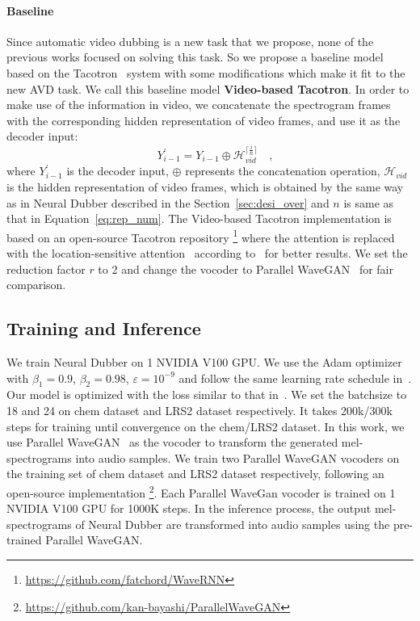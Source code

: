 \documentclass{article}
\begin{document}
\paragraph{Baseline}
\label{sec:taco}
Since automatic video dubbing is a new task that we propose, none of the previous works focused on solving this task. So we propose a baseline model based on the Tacotron~\cite{wang2017tacotron} system with some modifications which make it fit to the new AVD task. We call this baseline model \textbf{Video-based Tacotron}.
In order to make use of the information in video, we concatenate the spectrogram frames with the corresponding hidden representation of video frames, and use it as the decoder input:
\begin{equation}
\label{eq:taco}
\quad  Y^{'}_{i-1} = Y_{i-1} \oplus \mathcal{H}_{vid}^{\lceil \frac{i}{n} \rceil} \quad ,
\end{equation}
where $Y^{'}_{i-1}$ is the decoder input, $\oplus$ represents the concatenation operation, $\mathcal{H}_{vid}$ is the hidden representation of video frames, which is obtained by the same way as in Neural Dubber described in the Section~\ref{sec:desi_over} and $n$ is same as that in Equation~\eqref{eq:rep_num}.
The Video-based Tacotron implementation is based on an open-source Tacotron repository \footnote{\url{https://github.com/fatchord/WaveRNN}} where the attention is replaced with the location-sensitive attention~\cite{chorowski2015attention} according to~\cite{shen2018natural} for better results. We set the reduction factor $r$ to 2 and change the vocoder to Parallel WaveGAN~\cite{yamamoto2020parallel} for fair comparison.

\subsection{Training and Inference}
We train Neural Dubber on 1 NVIDIA V100 GPU. We use the Adam optimizer~\cite{kingma2014adam} with $\beta_{1}= 0.9$, $\beta_{2} = 0.98$, $\varepsilon = 10^{-9}$ and follow the same learning rate schedule in~\cite{vaswani2017attention}.
Our model is optimized with the loss similar to that in~\cite{ren2021fastspeech}.
We set the batchsize to 18 and 24 on chem dataset and LRS2 dataset respectively. It takes 200k/300k steps for training until convergence on the chem/LRS2 dataset.
In this work, we use Parallel WaveGAN~\cite{yamamoto2020parallel} as the vocoder to transform the generated mel-spectrograms into audio samples. We train two Parallel WaveGAN vocoders on the training set of chem dataset and LRS2 dataset respectively, following an open-source implementation \footnote{\url{https://github.com/kan-bayashi/ParallelWaveGAN}}. Each Parallel WaveGan vocoder is trained on 1 NVIDIA V100 GPU for 1000K steps.
In the inference process, the output mel-spectrograms of Neural Dubber are transformed into audio samples using the pre-trained Parallel WaveGAN. 
\end{document}
